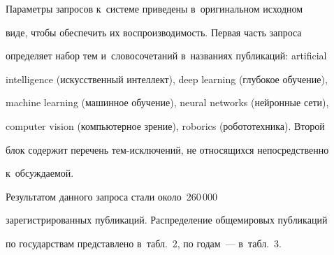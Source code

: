 


 Параметры запросов к~системе приведены в~оригинальном исходном 


виде, чтобы обеспечить их воспроизводимость. Первая часть запроса 


определяет набор тем и~словосочетаний в~названиях публикаций: artificial 


intelligence (искусственный интеллект), deep learning (глубокое обучение), 


machine learning (машинное обучение), neural networks (нейронные сети), 


computer vision (компьютерное зрение), roborics (робототехника). Второй 


блок содержит перечень тем-исключений, не относящихся непосредственно 


к~обсуждаемой.


 


 Результатом данного запроса стали около~260\,000 


зарегистрированных публикаций. Распределение общемировых публикаций 


по государствам представлено в~табл.~2, по годам~--- в~табл.~3.





